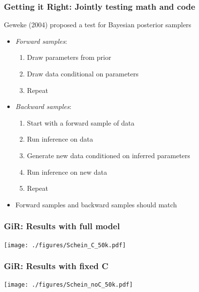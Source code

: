 \documentclass[10pt]{beamer}
\theoremstyle{definition}
\theoremstyle{remark}
\begin{document}
\begin{frame} \frametitle{Getting it Right: Jointly testing math and code}

Geweke (2004) proposed a test for Bayesian posterior samplers \vspace{.2cm}
\begin{itemize}
\item {\em Forward samples}: 
\begin{enumerate}
\item Draw parameters from prior
\item Draw data conditional on parameters
\item Repeat
\end{enumerate} \vspace{.2cm}
\item {\em Backward samples}: 
\begin{enumerate}
\item Start with a forward sample of data
\item Run inference on data
\item Generate new data conditioned on inferred parameters
\item Run inference on new data
\item Repeat
\end{enumerate} \vspace{.2cm}
\item Forward samples and backward samples should match
\end{itemize}


\end{frame}

\begin{frame} \frametitle{GiR: Results with full model}
\centering \vspace{-.4cm}
\texttt{[image: ./figures/Schein\_C\_50k.pdf]}

\end{frame}

\begin{frame} \frametitle{GiR: Results with fixed C}
\centering \vspace{-.4cm}
\texttt{[image: ./figures/Schein\_noC\_50k.pdf]}

\end{frame}
\end{document}
